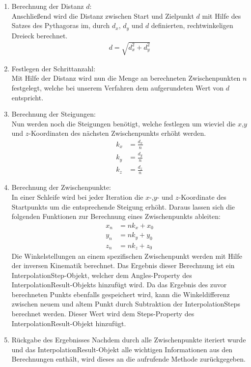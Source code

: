 \begin{itemize}
\begin{enumerate}
\item Berechnung der Distanz $d$:\\
Anschließend wird die Distanz zwischen Start und Zielpunkt $d$ mit Hilfe des Satzes des Pythagoras im, durch $d_x$, $d_y$ und $d$ definierten, rechtwinkeligen Dreieck berechnet.
\begin{align*}
d = \sqrt{d_x^2+d_y^2}
\end{align*}
\item Festlegen der Schrittanzahl:\\
Mit Hilfe der Distanz wird nun die Menge an berechneten Zwischenpunkten $n$ festgelegt, welche bei unserem Verfahren dem aufgerundeten Wert von $d$ entspricht.
\item Berechnung der Steigungen:\\
Nun werden noch die Steigungen benötigt, welche festlegen um wieviel die $x$,$y$ und $z$-Koordinaten des nächsten Zwischenpunkts erhöht werden.
\begin{align*}
k_x & = \frac{d_x}{n}\\
k_y & = \frac{d_y}{n}\\
k_z & = \frac{d_z}{n}
\end{align*}
\item Berechnung der Zwischenpunkte:\\
In einer Schleife wird bei jeder Iteration die $x$-,$y$- und $z$-Koordinate des Startpunkts um die entsprechende Steigung erhöht. Daraus lassen sich die folgenden Funktionen zur Berechnung eines Zwischenpunkts ableiten:
\begin{align*}
x_n & = n k_x + x_0\\
y_n & =  n k_y + y_0\\
z_n & = n k_z + z_0 
\end{align*}
Die Winkelstellungen an einem spezifischen Zwischenpunkt werden mit Hilfe der inversen Kinematik berechnet. Das Ergebnis dieser Berechnung ist ein InterpolationStep-Objekt, welcher dem Angles-Property des InterpolationResult-Objekts hinzufügt wird. Da das Ergebnis des zuvor berechneten Punkts ebenfalls gespeichert wird, kann die Winkeldifferenz zwischen neuem und altem Punkt durch Subtraktion der InterpolationSteps berechnet werden. Dieser Wert wird dem Steps-Property des InterpolationResult-Objekt hinzufügt.
\item Rückgabe des Ergebnisses
Nachdem durch alle Zwischenpunkte iteriert wurde und das InterpolationResult-Objekt alle wichtigen Informationen aus den Berechnungen enthält, wird dieses an die aufrufende Methode zurückgegeben.
\end{enumerate}

\end{itemize}
